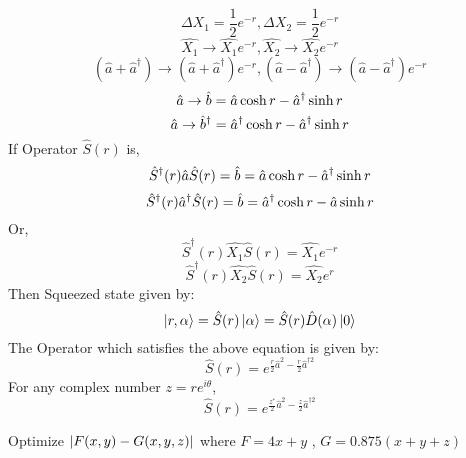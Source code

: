\documentclass[9pt]{article}
\begin{document}
\begin{equation*}
    \Delta X_1 = \frac{1}{2}e^{-r}, \Delta X_2 = \frac{1}{2}e^{-r}
\end{equation*}
\begin{equation*}
    \hat{X_1} \rightarrow \hat{X_1} e^{-r} , \hat{X_2} \rightarrow \hat{X_2} e^{-r}
\end{equation*}
\begin{equation*}
    (\hat{a}+\hat{a}^{\dagger}) \rightarrow (\hat{a}+\hat{a}^{\dagger})e^{-r} , (\hat{a}-\hat{a}^{\dagger}) \rightarrow (\hat{a}-\hat{a}^{\dagger})e^{-r}
\end{equation*}
\begin{equation*}
    \hat{a} \rightarrow \hat{b} = \hat{a} \hypcosine{r} - \hat{a}^{\dagger} \hypsine{r}
\end{equation*}
\begin{equation*}
    \hat{a} \rightarrow \hat{b}^{\dagger} = \hat{a}^{\dagger} \hypcosine{r} - \hat{a}^{\dagger} \hypsine{r}
\end{equation*}
If Operator $ \hat{S}(r) $ is,
\begin{equation*}
    \hat{S}^{\dagger} (r) \hat{a} \hat{S}(r) = \hat{b} = \hat{a} \hypcosine{r} - \hat{a}^{\dagger} \hypsine{r}
\end{equation*}
\begin{equation*}
    \hat{S}^{\dagger} (r) \hat{a}^{\dagger} \hat{S}(r) = \hat{b} = \hat{a}^{\dagger} \hypcosine{r} - \hat{a} \hypsine{r}
\end{equation*}
Or,
\begin{equation*}
    \hat{S}^{\dagger} (r) \hat{X_1} \hat{S}(r) = \hat{X_1}e^{-r}
\end{equation*}
\begin{equation*}
    \hat{S}^{\dagger} (r) \hat{X_2} \hat{S}(r) = \hat{X_2}e^{r}
\end{equation*}
Then Squeezed state given by:
\begin{equation*}
    \ket{r,\alpha}=\hat{S}(r)\ket{\alpha}=\hat{S}(r)\hat{D}(\alpha)\ket{0}
\end{equation*}
The Operator which satisfies the above equation is given by:
\begin{equation*}
    \hat{S}(r)=e^{\frac{r}{2}\hat{a}^2-\frac{r}{2}\hat{a}^{\dagger 2}}
\end{equation*}
For any complex number $ z=re^{i\theta} $,
\begin{equation*}
    \hat{S}(r)=e^{\frac{z^*}{2}\hat{a}^2-\frac{z}{2}\hat{a}^{\dagger 2}}
\end{equation*}

Optimize  $\abs{F(x,y)-G(x,y,z)}$  where  $F=4x+y$ , $G=0.875(x+y+z)$
\end{document}
